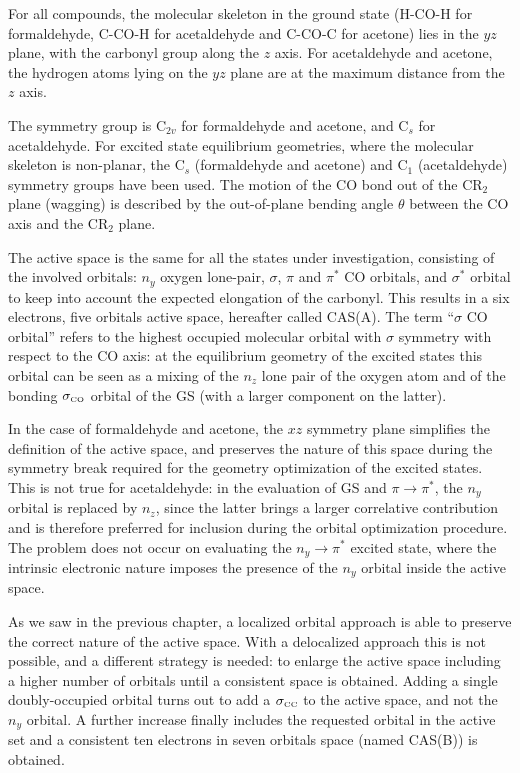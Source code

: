 For all compounds, the molecular skeleton in the ground state (\mbox{H-CO-H}
for formaldehyde, \mbox{C-CO-H} for acetaldehyde and \mbox{C-CO-C} for
acetone) lies in the $yz$ plane, with the carbonyl group along the $z$
axis. For acetaldehyde and acetone, the hydrogen atoms lying on the $yz$
plane are at the maximum distance from the $z$ axis. 

The symmetry group is C$_{2v}$ for formaldehyde and acetone, and C$_s$ for
acetaldehyde.  For excited state equilibrium geometries, where the molecular
skeleton is non-planar, the C$_s$ (formaldehyde and acetone) and C$_1$
(acetaldehyde) symmetry groups have been used. The motion of the CO bond
out of the CR$_2$ plane (wagging) is described by the out-of-plane bending
angle $\theta$ between the CO axis and the CR$_2$ plane. 

The active space is the same for all the states under investigation,
consisting of the involved orbitals: $n_y$ oxygen lone-pair, $\sigma$,
$\pi$ and $\pi^{*}$ CO orbitals, and $\sigma^{*}$ orbital to keep into
account the expected elongation of the carbonyl. This results in a six
electrons, five orbitals active space, hereafter called CAS(A).
The term ``$\sigma$ CO orbital'' refers to the highest occupied
molecular orbital with $\sigma$ symmetry with respect to the CO axis: at the
equilibrium geometry of the excited states this orbital can be seen as a
mixing of the $n_z$ lone pair of the oxygen atom and of the bonding
$\sigma_{\mbox{\tiny CO}}$ orbital of the GS (with a larger component on the latter).

In the case of formaldehyde and acetone, the $xz$ symmetry plane 
simplifies the definition of the active space, and preserves the nature of
this space during the symmetry break required for the geometry optimization
of the excited states. This is not true for acetaldehyde: in the evaluation
of GS and $\pi \rightarrow \pi^{*}$, the $n_y$ orbital is replaced by $n_z$,
since the latter brings a larger correlative contribution and is therefore
preferred for inclusion during the orbital optimization procedure. The
problem does not occur on evaluating the $n_y \rightarrow \pi^{*}$ excited
state, where the intrinsic electronic nature imposes the presence of the
$n_y$ orbital inside the active space.

As we saw in the previous chapter, a localized orbital approach is able to
preserve the correct nature of the active space. With a delocalized approach
this is not possible, and a different strategy is needed: to enlarge
the active space including a higher number of orbitals until a consistent
space is obtained. Adding a single doubly-occupied orbital turns out to add
a $\sigma_{\mbox{\tiny CC}}$ to the active space, and not the $n_y$ orbital. A further
increase finally includes the requested orbital in the active set and a
consistent ten electrons in seven orbitals space (named CAS(B)) is
obtained.

